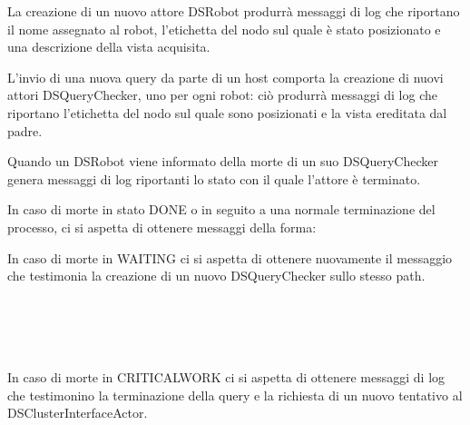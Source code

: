 La creazione di un nuovo attore DSRobot produrrà messaggi di log che riportano
il nome assegnato al robot, l'etichetta del nodo sul quale è stato posizionato
e una descrizione della vista acquisita.\\


L'invio di una nuova query da parte di un host comporta la creazione di nuovi attori DSQueryChecker,
uno per ogni robot: ciò produrrà messaggi di log che riportano
l'etichetta del nodo sul quale sono posizionati e la vista ereditata dal padre.\\


Quando un DSRobot viene informato della morte di un suo DSQueryChecker
genera messaggi di log riportanti lo stato con il quale l'attore è terminato.

In caso di morte in stato DONE o in seguito a una normale terminazione del
processo, ci si aspetta di ottenere messaggi della forma:\\

In caso di morte in WAITING ci si aspetta di ottenere nuovamente il messaggio
che testimonia la creazione di un nuovo DSQueryChecker sullo stesso path.\\
\\
\printlog{[...]}\\
\\
\printlog{[...]}\\

In caso di morte in CRITICALWORK ci si aspetta di ottenere messaggi di log
che testimonino la terminazione della query e la richiesta di un nuovo
tentativo al DSClusterInterfaceActor.\\
\\
\printlog{[...]}\\

